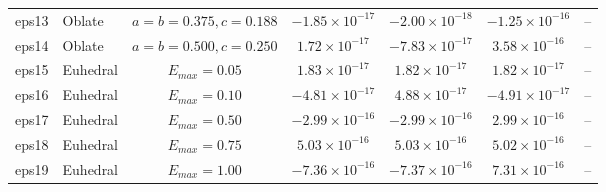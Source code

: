 \documentclass[11pt,a4paper]{article}
\begin{document}
\begin{landscape}
\begin{table}[!htbp]
\begin{tabular}{llccccc}
eps13 & Oblate & $a = b = 0.375, c = 0.188$ & $-1.85 \times 10^{-17}$ & $-2.00 \times 10^{-18}$ & $-1.25 \times 10^{-16}$ & -- \\
eps14 & Oblate & $a = b = 0.500, c = 0.250$ & $1.72 \times 10^{-17}$ & $-7.83 \times 10^{-17}$ & $3.58 \times 10^{-16}$ & -- \\ \hline
eps15 & Euhedral & $E_{max} = 0.05$ & $1.83 \times 10^{-17}$ & $1.82 \times 10^{-17}$ & $1.82 \times 10^{-17}$ & -- \\
eps16 & Euhedral & $E_{max} = 0.10$ & $-4.81 \times 10^{-17}$ & $4.88 \times 10^{-17}$ & $-4.91 \times 10^{-17}$ & -- \\
eps17 & Euhedral & $E_{max} = 0.50$ & $-2.99 \times 10^{-16}$ & $-2.99 \times 10^{-16}$ & $2.99 \times 10^{-16}$ & -- \\
eps18 & Euhedral & $E_{max} = 0.75$ & $5.03 \times 10^{-16}$ & $5.03 \times 10^{-16}$ & $5.02 \times 10^{-16}$ & -- \\
eps19 & Euhedral & $E_{max} = 1.00$ & $-7.36 \times 10^{-16}$ & $-7.37 \times 10^{-16}$ & $7.31 \times 10^{-16}$ & -- \\ \hline
\end{tabular}
\end{table}

\end{landscape}
\end{document}
